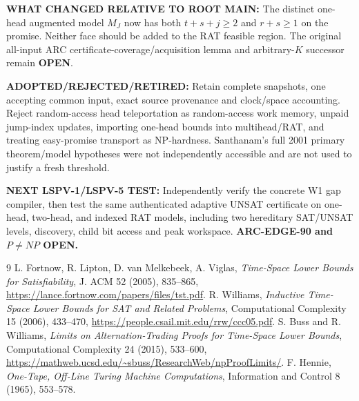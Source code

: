 \documentclass[11pt]{article}
\begin{document}
\noindent\textbf{WHAT CHANGED RELATIVE TO ROOT MAIN:}
The distinct one-head augmented model $M_J$ now has both
$t+s+j\ge2$ and $r+s\ge1$ on the promise.
Neither face should be added to the RAT feasible region.
The original all-input ARC certificate-coverage/acquisition lemma
and arbitrary-$K$ successor remain \textbf{OPEN}.

\noindent\textbf{ADOPTED/REJECTED/RETIRED:}
Retain complete snapshots, one accepting common input,
exact source provenance and clock/space accounting.
Reject random-access head teleportation as random-access work memory,
unpaid jump-index updates, importing one-head bounds into multihead/RAT,
and treating easy-promise transport as NP-hardness.
Santhanam's full 2001 primary theorem/model hypotheses were not
independently accessible and are not used to justify a fresh threshold.

\noindent\textbf{NEXT LSPV-1/LSPV-5 TEST:}
Independently verify the concrete W1 gap compiler,
then test the same authenticated adaptive UNSAT certificate on
one-head, two-head, and indexed RAT models,
including two hereditary SAT/UNSAT levels, discovery,
child bit access and peak workspace.
\textbf{ARC-EDGE-90 and $P\ne NP$ OPEN.}

\begin{thebibliography}{9}
 L. Fortnow, R. Lipton, D. van Melkebeek, A. Viglas,
\emph{Time-Space Lower Bounds for Satisfiability}, J. ACM 52 (2005), 835--865,
\url{https://lance.fortnow.com/papers/files/tst.pdf}.
 R. Williams,
\emph{Inductive Time-Space Lower Bounds for SAT and Related Problems},
Computational Complexity 15 (2006), 433--470,
\url{https://people.csail.mit.edu/rrw/ccc05.pdf}.
 S. Buss and R. Williams,
\emph{Limits on Alternation-Trading Proofs for Time-Space Lower Bounds},
Computational Complexity 24 (2015), 533--600,
\url{https://mathweb.ucsd.edu/~sbuss/ResearchWeb/npProofLimits/}.
 F. Hennie,
\emph{One-Tape, Off-Line Turing Machine Computations},
Information and Control 8 (1965), 553--578.
\end{thebibliography}
\end{document}
